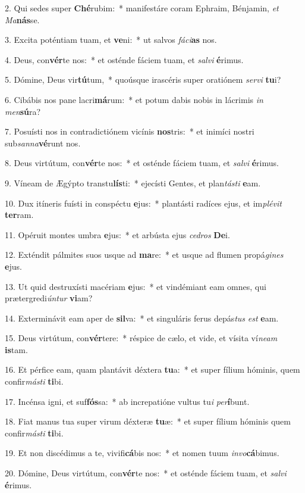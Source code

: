 2. Qui sedes super \textbf{Ché}rubim:~*  manifestáre coram Ephraim, Bénjamin, \textit{et} \textit{Ma}\textbf{nás}se.\

3. Excita poténtiam tuam, et \textbf{ve}ni:~*  ut salvos \textit{fá}\textit{ci}\textbf{as} nos.\

4. Deus, con\textbf{vér}te nos:~*  et osténde fáciem tuam, et \textit{sal}\textit{vi} \textbf{é}rimus.\

5. Dómine, Deus vir\textbf{tú}tum,~*  quoúsque irascéris super oratiónem \textit{ser}\textit{vi} \textbf{tu}i?\

6. Cibábis nos pane lacri\textbf{má}rum:~*  et potum dabis nobis in lácrimis \textit{in} \textit{men}\textbf{sú}ra?\

7. Posuísti nos in contradictiónem vicínis \textbf{nos}tris:~*  et inimíci nostri sub\textit{san}\textit{na}\textbf{vé}runt nos.\

8. Deus virtútum, con\textbf{vér}te nos:~*  et osténde fáciem tuam, et \textit{sal}\textit{vi} \textbf{é}rimus.\

9. Víneam de Ægýpto transtu\textbf{lís}ti:~*  ejecísti Gentes, et plan\textit{tás}\textit{ti} \textbf{e}am.\

10. Dux itíneris fuísti in conspéctu \textbf{e}jus:~*  plantásti radíces ejus, et im\textit{plé}\textit{vit} \textbf{ter}ram.\

11. Opéruit montes umbra \textbf{e}jus:~*  et arbústa ejus \textit{ce}\textit{dros} \textbf{De}i.\

12. Exténdit pálmites suos usque ad \textbf{ma}re:~*  et usque ad flumen propá\textit{gi}\textit{nes} \textbf{e}jus.\

13. Ut quid destruxísti macériam \textbf{e}jus:~*  et vindémiant eam omnes, qui prætergredi\textit{ún}\textit{tur} \textbf{vi}am?\

14. Exterminávit eam aper de \textbf{sil}va:~*  et singuláris ferus depás\textit{tus} \textit{est} \textbf{e}am.\

15. Deus virtútum, con\textbf{vér}tere:~*  réspice de cælo, et vide, et vísita ví\textit{ne}\textit{am} \textbf{is}tam.\

16. Et pérfice eam, quam plantávit déxtera \textbf{tu}a:~*  et super fílium hóminis, quem confir\textit{más}\textit{ti} \textbf{ti}bi.\

17. Incénsa igni, et suf\textbf{fós}sa:~*  ab increpatióne vultus tu\textit{i} \textit{per}\textbf{í}bunt.\

18. Fiat manus tua super virum déxteræ \textbf{tu}æ:~*  et super fílium hóminis quem confir\textit{más}\textit{ti} \textbf{ti}bi.\

19. Et non discédimus a te, vivifi\textbf{cá}bis nos:~*  et nomen tuum \textit{in}\textit{vo}\textbf{cá}bimus.\

20. Dómine, Deus virtútum, con\textbf{vér}te nos:~*  et osténde fáciem tuam, et \textit{sal}\textit{vi} \textbf{é}rimus.\

